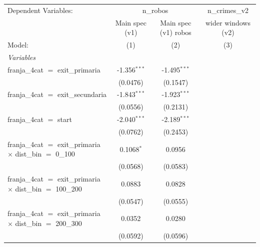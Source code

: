 
\begingroup
\centering
\begin{tabular}{lccc}
   \tabularnewline \midrule \midrule
   Dependent Variables: & \multicolumn{2}{c}{n\_robos} & n\_crimes\_v2\\
                                                                                   & Main spec (v1)  & Main spec (v1) robos & wider windows (v2) \\   
   Model:                                                                          & (1)             & (2)                  & (3)\\  
   \midrule
   \emph{Variables}\\
   franja\_4cat $=$ exit\_primaria                                                 & -1.356$^{***}$  & -1.495$^{***}$       &   \\   
                                                                                   & (0.0476)        & (0.1547)             &   \\   
   franja\_4cat $=$ exit\_secundaria                                               & -1.843$^{***}$  & -1.923$^{***}$       &   \\   
                                                                                   & (0.0556)        & (0.2131)             &   \\   
   franja\_4cat $=$ start                                                          & -2.040$^{***}$  & -2.189$^{***}$       &   \\   
                                                                                   & (0.0762)        & (0.2453)             &   \\   
   franja\_4cat $=$ exit\_primaria $\times$ dist\_bin $=$ 0\_100                   & 0.1068$^{*}$    & 0.0956               &   \\   
                                                                                   & (0.0568)        & (0.0583)             &   \\   
   franja\_4cat $=$ exit\_primaria $\times$ dist\_bin $=$ 100\_200                 & 0.0883          & 0.0828               &   \\   
                                                                                   & (0.0547)        & (0.0555)             &   \\   
   franja\_4cat $=$ exit\_primaria $\times$ dist\_bin $=$ 200\_300                 & 0.0352          & 0.0280               &   \\   
                                                                                   & (0.0592)        & (0.0596)             &   \\   

\end{tabular}
